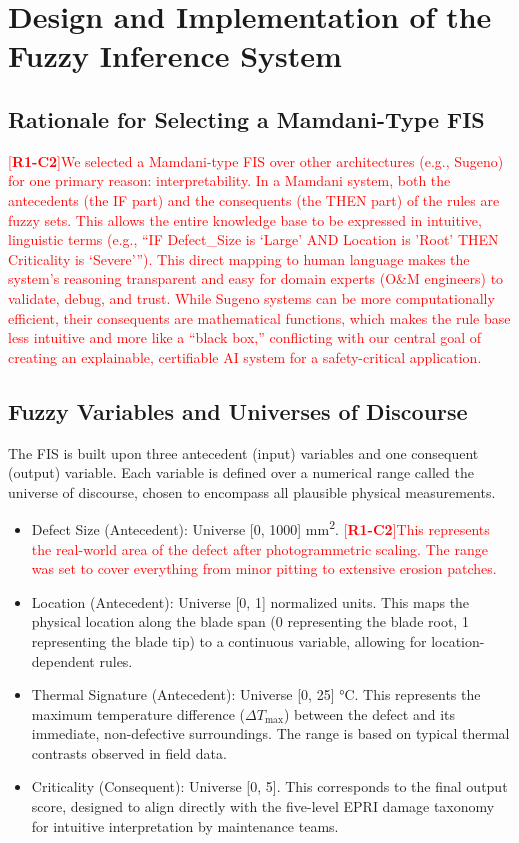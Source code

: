 \documentclass[energies,supfile,submit,pdftex,moreauthors]{Definitions/mdpi}
\newcommand{\revtag}[2]{[\textbf{R#1-C#2}]}
\newcommand{\Rone}[1]{\textcolor{red}{#1}}
\begin{document}
\section{Design and Implementation of the Fuzzy Inference System}\label{sec:fis_implementation}

\subsection{Rationale for Selecting a Mamdani-Type FIS}
\Rone{\revtag{1}{2}We selected a Mamdani-type FIS over other architectures (e.g., Sugeno) for one primary reason: interpretability. In a Mamdani system, both the antecedents (the IF part) and the consequents (the THEN part) of the rules are fuzzy sets. This allows the entire knowledge base to be expressed in intuitive, linguistic terms (e.g., ``IF Defect\_Size is `Large' AND Location is 'Root' THEN Criticality is `Severe'''). This direct mapping to human language makes the system's reasoning transparent and easy for domain experts (O\&M engineers) to validate, debug, and trust. While Sugeno systems can be more computationally efficient, their consequents are mathematical functions, which makes the rule base less intuitive and more like a ``black box,'' conflicting with our central goal of creating an explainable, certifiable AI system for a safety-critical application.}

\subsection{Fuzzy Variables and Universes of Discourse}
The FIS is built upon three antecedent (input) variables and one consequent (output) variable. Each variable is defined over a numerical range called the universe of discourse, chosen to encompass all plausible physical measurements.
\begin{itemize}
    \item Defect Size (Antecedent): Universe [0, 1000] \si{mm^2}. \Rone{\revtag{1}{2}This represents the real-world area of the defect after photogrammetric scaling. The range was set to cover everything from minor pitting to extensive erosion patches.}
    \item Location (Antecedent): Universe [0, 1] normalized units. This maps the physical location along the blade span (0 representing the blade root, 1 representing the blade tip) to a continuous variable, allowing for location-dependent rules.
    \item Thermal Signature (Antecedent): Universe [0, 25] \si{\celsius}. This represents the maximum temperature difference (\(\Delta T_{\max}\)) between the defect and its immediate, non-defective surroundings. The range is based on typical thermal contrasts observed in field data.
    \item Criticality (Consequent): Universe [0, 5]. This corresponds to the final output score, designed to align directly with the five-level EPRI damage taxonomy for intuitive interpretation by maintenance teams.
\end{itemize}
\end{document}
